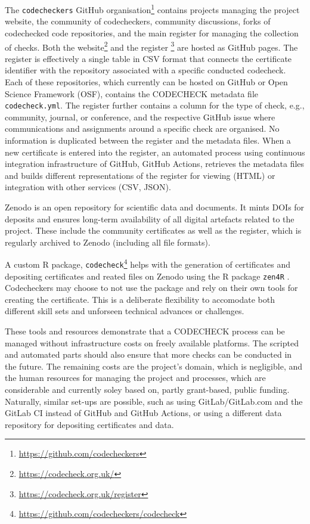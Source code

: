 \documentclass[12pt]{article}
\begin{document}
The \texttt{codecheckers} GitHub organisation\footnote{
\url{https://github.com/codecheckers}} contains projects managing the
project website, the community of codecheckers, community discussions,
forks of codechecked code repositories, and the main register for
managing the collection of checks. Both the website\footnote{
\url{https://codecheck.org.uk/}} and the register
\footnote{\url{https://codecheck.org.uk/register}} are hosted as GitHub
pages. The register is effectively a single table in CSV format that
connects the certificate identifier with the repository associated with
a specific conducted codecheck. Each of these repositories, which 
currently can be hosted on GitHub or Open Science Framework (OSF), 
contains the CODECHECK metadata file \texttt{codecheck.yml}. The register
further contains a column for the type of check, e.g., community, journal,
or conference, and the respective GitHub issue where communications and 
assignments around a specific check are organised. No information is 
duplicated between the register and the metadata files. When a new
certificate is entered into the register, an automated process using 
continuous integration infrastructure of GitHub, GitHub Actions, retrieves
the metadata files and builds different representations of the register
for viewing (HTML) or integration with other services (CSV, JSON).

Zenodo is an open repository for scientific data and documents. It
mints DOIs for deposits and ensures long-term availability of all digital
artefacts related to the project. These include the community 
certificates as well as the register, which is regularly archived to 
Zenodo \cite{codecheck_register} (including all file formats).

A custom R package, \texttt{codecheck}\footnote{
\url{https://github.com/codecheckers/codecheck}} helps with the generation
of certificates and depositing certificates and reated files on Zenodo 
using the R package \texttt{zen4R} \cite{zen4r}.
Codecheckers may choose to not use the package and rely on their own tools
for creating the certificate. This is a deliberate flexibility to
accomodate both different skill sets and unforseen technical advances or
challenges.

These tools and resources demonstrate that a CODECHECK process can be
managed without infrastructure costs on freely available platforms.
The scripted and automated parts should also ensure that more checks can
be conducted in the future.
The remaining costs are the project's domain, which is negligible, and
the human resources for managing the project and processes, which are
considerable and currently soley based on, partly grant-based, public funding.
Naturally, similar set-ups are possible, such as using GitLab/GitLab.com 
and the GitLab CI instead of GitHub and GitHub Actions, or using a different 
data repository for depositing certificates and data.
\end{document}
